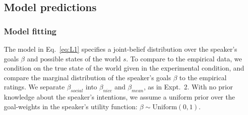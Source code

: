 \documentclass[10pt,letterpaper]{article}
\newcommand{\ndg}[1]{\textcolor{Green}{[ndg: #1]}}
\begin{document}

\subsection{Model predictions}

\subsubsection{Model fitting}

The model in Eq.~\ref{eq:L1} specifies a joint-belief distribution over the speaker's goals $\beta$ and possible states of the world $s$.
To compare to the empirical data, we condition on the true state of the world given in the experimental condition, and compare the marginal distribution of the speaker's goals $\beta$ to the empirical ratings.
We separate $\beta_{social}$ into  $\beta_{nice}$ and  $\beta_{mean}$, as in Expt.~2.
With no prior knowledge about the speaker's intentions, we assume a uniform prior over the goal-weights in the speaker's utility function: $\beta \sim \text{Uniform}(0,1)$.
\end{document}

